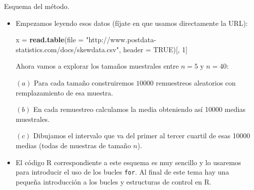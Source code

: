 \documentclass[
  9pt,
  ignorenonframetext,
]{beamer}
\newenvironment{Shaded}{\begin{snugshade}}{\end{snugshade}}
\newcommand{\DataTypeTok}[1]{\textcolor[rgb]{0.13,0.29,0.53}{#1}}
\newcommand{\DecValTok}[1]{\textcolor[rgb]{0.00,0.00,0.81}{#1}}
\newcommand{\KeywordTok}[1]{\textcolor[rgb]{0.13,0.29,0.53}{\textbf{#1}}}
\newcommand{\NormalTok}[1]{#1}
\newcommand{\OtherTok}[1]{\textcolor[rgb]{0.56,0.35,0.01}{#1}}
\newcommand{\StringTok}[1]{\textcolor[rgb]{0.31,0.60,0.02}{#1}}
\begin{document}
\begin{frame}[fragile]{Esquema del método.}
\protect\hypertarget{esquema-del-metodo.}{}

\begin{itemize}
\item
  Empezamos leyendo esos datos (fíjate en que usamos directamente la
  URL):\small

\begin{Shaded}
\begin{Highlighting}[]
\NormalTok{x =}\StringTok{ }\KeywordTok{read.table}\NormalTok{(}\DataTypeTok{file =} \StringTok{"http://www.postdata-statistics.com/docs/skewdata.csv"}\NormalTok{, }
               \DataTypeTok{header =} \OtherTok{TRUE}\NormalTok{)[, }\DecValTok{1}\NormalTok{]}
\end{Highlighting}
\end{Shaded}

  \normalsize Ahora vamos a explorar los tamaños muestrales entre
  \(n = 5\) y \(n = 40\):

  \((a)\) Para cada tamaño construiremos \(10000\) remuestreos
  aleatorios con remplazamiento de esa muestra.

  \((b)\) En cada remuestreo calculamos la media obteniendo así 10000
  medias muestrales.

  \((c)\) Dibujamos el intervalo que va del primer al tercer cuartil de
  esas 10000 medias (todas de muestras de tamaño \(n\)).
\item
  El código R correspondiente a este esquema es muy sencillo y lo
  usaremos para introducir el uso de los bucles \texttt{for}. Al final
  de este tema hay una pequeña introducción a los bucles y estructuras
  de control en R.
\end{itemize}

\end{frame}
\end{document}
